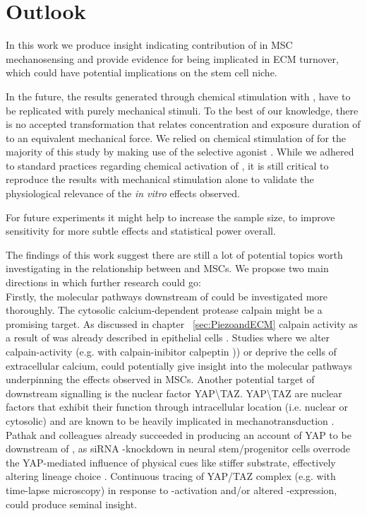 \chapter{Outlook}
In this work we produce insight indicating contribution of \Piezo{} in MSC mechanosensing and provide evidence for \Piezo{} being implicated in ECM turnover, which could have potential implications on the stem cell niche.


In the future, the results generated through chemical stimulation with \Yoda{}, have to be replicated with purely mechanical stimuli. To the best of our knowledge, there is no accepted transformation that relates concentration and exposure duration of \Yoda{} to an equivalent mechanical force. We relied on chemical stimulation of \Piezo{} for the majority of this study by making use of the selective \Piezo{} agonist \Yoda{}. While we adhered to standard practices regarding chemical activation of \Piezo{}\cite{Morley2018}, it is still critical to reproduce the results with mechanical stimulation alone to validate the physiological relevance of the \textit{in vitro} effects observed. \par

For future experiments it might help to increase the sample size, to improve sensitivity for more subtle effects and statistical power overall. \par

The findings of this work suggest there are still a lot of potential topics worth investigating in the relationship between \Piezo{} and MSCs. We propose two main directions in which further research could go:\\
Firstly, the molecular pathways downstream of \Piezo{} could be investigated more thoroughly. The cytosolic calcium-dependent protease calpain might be a promising target. As discussed in chapter ~\vref{sec:PiezoandECM} calpain activity as a result of \Piezo{} was already described in epithelial cells \cite{McHugh2010}. Studies where we alter calpain-activity (e.g. with calpain-inibitor calpeptin \cite{Schoenwaelder1999})) or deprive the cells of extracellular calcium, could potentially give insight into the molecular pathways underpinning the effects observed in MSCs. Another potential target of \Piezo{} downstream signalling is the nuclear factor YAP\textbackslash{}TAZ. YAP\textbackslash{}TAZ are nuclear factors that exhibit their function through intracellular location (i.e. nuclear or cytosolic) and are known to be heavily implicated in mechanotransduction \cite{Dupont2011}. Pathak and colleagues already succeeded in producing an account of YAP to be downstream of \Piezo{}, as siRNA \Piezo{}-knockdown in neural stem/progenitor cells overrode the YAP-mediated influence of physical cues like stiffer substrate, effectively altering lineage choice \cite{Pathak2014}. Continuous tracing of YAP/TAZ complex (e.g. with time-lapse microscopy) in response to \Yoda{}-activation and/or altered \Piezo{}-expression, could produce seminal insight.\par

